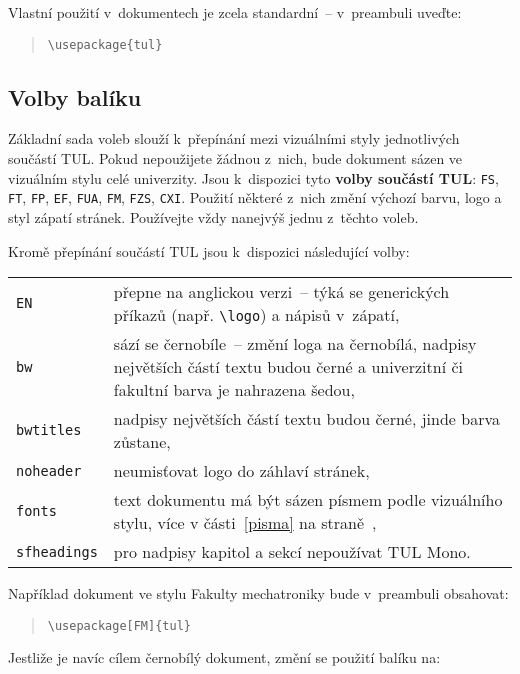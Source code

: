 \documentclass[a4paper,12pt,fonts,numbering]{./tulpackage/tularticle}
\makeatletter
\newcommand{\cmdfont}[1]{\texttt{\color{\tulcolor}#1}}
\newcommand{\cmdnoindex}[1]{\cmdfont{\textbackslash #1}}
\newcommand{\cmd}[1]{\cmdnoindex{#1}\index{#1@\textbackslash #1}}
\makeatother
\begin{document}
Vlastní použití v~dokumentech je zcela standardní~-- v~preambuli uveďte:

\begin{quote}
\cmdnoindex{usepackage\{tul\}}
\end{quote}


\subsection*{Volby balíku}

Základní sada voleb slouží k~přepínání mezi vizuálními styly jednotlivých
součástí TUL. Pokud nepoužijete žádnou z~nich, bude dokument sázen ve
vizuálním stylu celé univerzity. Jsou k~dispozici tyto \textbf{volby součástí
TUL}: \cmdfont{FS}, \cmdfont{FT}, \cmdfont{FP}, \cmdfont{EF}, \cmdfont{FUA},
\cmdfont{FM}, \cmdfont{FZS}, \cmdfont{CXI}. Použití některé z~nich změní
výchozí barvu, logo a styl zápatí stránek. Používejte vždy nanejvýš jednu
z~těchto voleb.

Kromě přepínání součástí TUL jsou k~dispozici následující volby:

\medskip

\begin{tabularx}{\textwidth}{@{}lX}
\cmdfont{EN} & přepne na anglickou verzi~-- týká se generických příkazů
(např. \cmd{logo}) a nápisů v~zápatí,\\
\cmdfont{bw} & sází se černobíle~-- změní loga na černobílá, nadpisy největších
částí textu budou černé a univerzitní či fakultní barva je nahrazena šedou,\\
\cmdfont{bwtitles} & nadpisy největších částí textu budou černé, jinde barva
zůstane,\\
\cmdfont{noheader} & neumisťovat logo do záhlaví stránek,\\
\cmdfont{fonts} & text dokumentu má být sázen písmem podle vizuálního stylu,
více v části~\ref{pisma} na straně~\pageref{pisma},\\
\cmdfont{sfheadings} & pro nadpisy kapitol a sekcí nepoužívat TUL Mono.\\
\end{tabularx}

\medskip

Například dokument ve stylu Fakulty mechatroniky bude v~preambuli obsahovat:

\begin{quote}
\cmdnoindex{usepackage[FM]\{tul\}}
\end{quote}

Jestliže je navíc cílem černobílý dokument, změní se použití balíku na:
\end{document}
